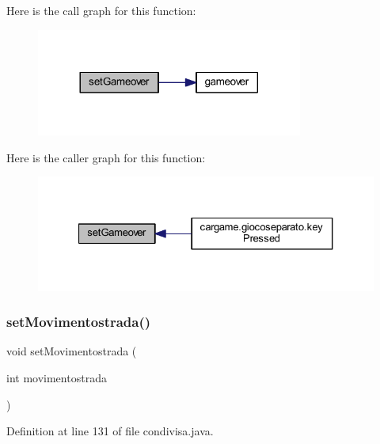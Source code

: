 Here is the call graph for this function\+:
\nopagebreak
\begin{figure}[H]
\begin{center}
\leavevmode
\includegraphics[width=248pt]{classcargame_1_1condivisa_a69ebe98d89726ab5ee3c8bb7774d7541_cgraph}
\end{center}
\end{figure}
Here is the caller graph for this function\+:
\nopagebreak
\begin{figure}[H]
\begin{center}
\leavevmode
\includegraphics[width=327pt]{classcargame_1_1condivisa_a69ebe98d89726ab5ee3c8bb7774d7541_icgraph}
\end{center}
\end{figure}
\mbox{\label{classcargame_1_1condivisa_ac46fe43a46f5b9232c29e36c7e4a65d4}} 
\subsubsection{\texorpdfstring{set\+Movimentostrada()}{setMovimentostrada()}}
{\footnotesize\ttfamily void set\+Movimentostrada (\begin{DoxyParamCaption}\item[{int}]{movimentostrada }\end{DoxyParamCaption})}



Definition at line 131 of file condivisa.\+java.

